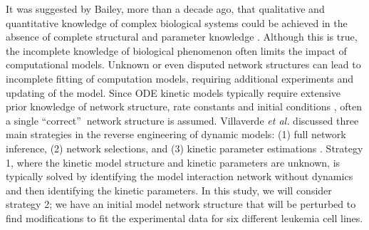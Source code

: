 \documentclass[12pt]{article}
\begin{document}
It was suggested by Bailey, more than a decade ago, that qualitative and quantitative knowledge of complex biological systems could be achieved in the absence of complete structural and parameter knowledge \cite{Bailey2001}. Although this is true, the incomplete knowledge of biological phenomenon often limits the impact of computational models. Unknown or even disputed network structures can lead to incomplete fitting of computation models, requiring additional experiments and updating of the model. Since ODE kinetic models typically require extensive prior knowledge of network structure, rate constants and initial conditions \cite{Kholodenko2012}, often a single \textquotedblleft correct\textquotedblright $\:$  network structure is assumed. Villaverde  \textit{et al.} discussed three main strategies in the reverse engineering of dynamic models: (1) full network inference, (2) network selections, and (3) kinetic parameter estimations \cite{Villaverde:2014kl}. Strategy 1, where the kinetic model structure and kinetic parameters are unknown, is typically solved by identifying the model interaction network without dynamics and then identifying the kinetic parameters. In this study, we will consider strategy 2; we have an initial model network structure that will be perturbed to find modifications to fit the experimental data for six different leukemia cell lines. 
\end{document}
